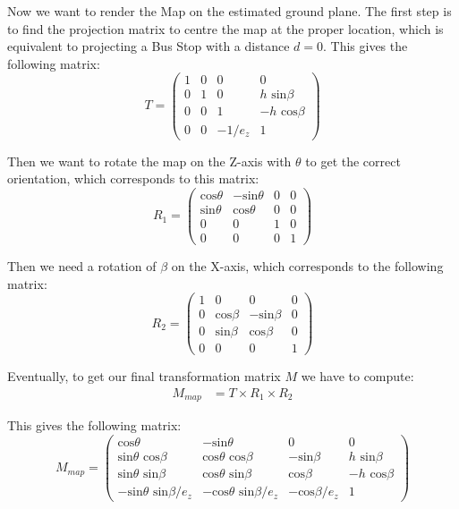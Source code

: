 Now we want to render the Map on the estimated ground plane. The first step is to find the projection matrix to centre the map at the proper location, which is equivalent to projecting a Bus Stop with a distance $d = 0$. This gives the following matrix:
\begin{equation}
 T = \left( \begin{array}{cccc}
	1 			&0 		& 0			& 0\\
	0 			& 1		& 0			& h \textrm{ sin} \beta\\
	0			& 0		& 1			& -h \textrm{ cos} \beta\\
	0			& 0		& -1/e_z		& 1
\end{array} \right)
\end{equation}

Then we want to rotate the map on the Z-axis with $\theta$ to get the correct orientation, which corresponds to this matrix:
\begin{equation}
R_1 = \left( \begin{array}{cccc}
	\textrm{cos} \theta 	& -\textrm{sin} \theta 	& 0	& 0	\\
	\textrm{sin} \theta 	& \textrm{cos} \theta 		& 0	& 0	\\
	0				& 0					& 1	& 0	\\
	0				& 0					& 0	& 1	
\end{array} \right)
\end{equation}

Then we need a rotation of $\beta$ on the X-axis, which corresponds to the following matrix:
\begin{equation}
R_2 = \left( \begin{array}{cccc}
	1 	& 0 					& 0					& 0\\
	0 	& \textrm{cos} \beta 		& -\textrm{sin} \beta		& 0\\
	0	& \textrm{sin} \beta		& \textrm{cos} \beta		& 0\\
	0	& 0					& 0					& 1	
\end{array} \right)
\end{equation}

Eventually, to get our final transformation matrix $M$ we have to compute:
\begin{align}
M_{map} 	&= T\times R_1\times R_2
\end{align}

This gives the following matrix:
\begin{equation}
 M_{map} = \left( \begin{array}{cccc}
	\textrm{cos} \theta 						& -\textrm{sin} \theta 					& 0						& 0\\
	\textrm{sin} \theta \textrm{ cos} \beta 			& \textrm{cos} \theta \textrm{ cos} \beta		& -\textrm{sin} \beta			& h \textrm{ sin} \beta\\
	\textrm{sin} \theta \textrm{ sin} \beta			& \textrm{cos} \theta \textrm{ sin} \beta		& \textrm{cos} \beta			& -h \textrm{ cos} \beta\\
	-\textrm{sin} \theta \textrm{ sin} \beta / e_z		& -\textrm{cos} \theta \textrm{ sin} \beta/e_z	& -\textrm{cos} \beta/e_z		& 1
\end{array} \right)
\end{equation}


